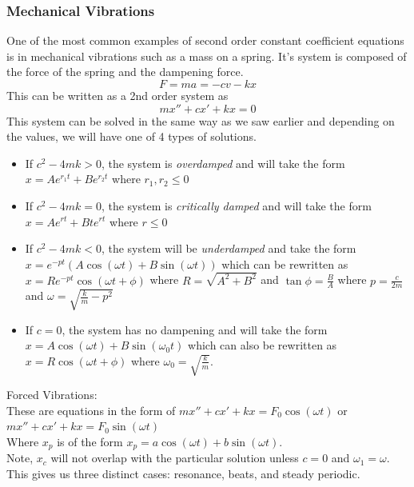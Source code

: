 \subsubsection{Mechanical Vibrations}
One of the most common examples of second order constant coefficient equations is in mechanical vibrations such as a mass on a spring. It's system is composed of the force of the spring and the dampening force.
$$F=ma=-cv-kx$$
This can be written as a 2nd order system as
$$mx''+cx'+kx=0$$
This system can be solved in the same way as we saw earlier and depending on the values, we will have one of 4 types of solutions.
\begin{itemize}
    \item If $c^2-4mk>0$, the system is \textit{overdamped} and will take the form $x=Ae^{r_1t}+Be^{r_2t}$ where $r_1,r_2\leq0$
    \item If $c^2-4mk=0$, the system is \textit{critically damped} and will take the form $x=Ae^{rt}+Bte^{rt}$ where $r\leq0$
    \item If $c^2-4mk<0$, the system will be \textit{underdamped} and take the form $x=e^{-pt}(A\cos(\omega t)+B\sin(\omega t))$ which can be rewritten as $x=Re^{-pt}\cos(\omega t+\phi)$ where $R=\sqrt{A^2+B^2}$ and $\tan\phi=\frac{B}{A}$ where $p=\frac{c}{2m}$ and $\omega=\sqrt{\frac{k}{m}-p^2}$
    \item If $c=0$, the system has no dampening and will take the form $x=A\cos(\omega t)+B\sin(\omega_0 t)$ which can also be rewritten as $x=R\cos(\omega t+\phi)$ where $\omega_0=\sqrt{\frac{k}{m}}$.
\end{itemize}
Forced Vibrations:\\
These are equations in the form of $mx''+cx'+kx=F_0\cos(\omega t)$ or $mx''+cx'+kx=F_0\sin(\omega t)$\\
Where $x_p$ is of the form $x_p=a\cos(\omega t)+b\sin(\omega t)$.\\
Note, $x_c$ will not overlap with the particular solution unless $c=0$ and $\omega_1=\omega$. This gives us three distinct cases: resonance, beats, and steady periodic.\\


